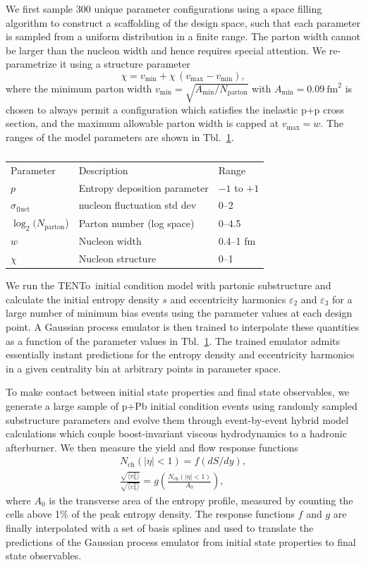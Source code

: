 \documentclass[3p,times,procedia]{elsarticle}
\newcommand{\trento}{T\raisebox{-0.3ex}{R}ENTo}
\newcommand{\e}{\varepsilon}
\newcommand{\paddedhline}{\noalign{\smallskip}\hline\noalign{\smallskip}}
\newcommand{\vn}{\sqrt{\langle v_n^2 \rangle}}
\newcommand{\en}{\sqrt{\langle \varepsilon_n^2 \rangle}}
\begin{document}
We first sample $300$ unique parameter configurations using a space filling algorithm to construct a scaffolding of the design space, such that each parameter is sampled from a uniform distribution in a finite range.
The parton width cannot be larger than the nucleon width and hence requires special attention.
We re-parametrize it using a structure parameter
\begin{equation}
  \chi = v_\mathrm{min} + \chi\, (v_\mathrm{max} - v_\mathrm{min}), 
\end{equation}
where the minimum parton width $v_\mathrm{min}=\sqrt{A_\mathrm{min}/N_\mathrm{parton}}$ with $A_\mathrm{min}=0.09 ~\mathrm{fm}^2$ is chosen to always permit a configuration which satisfies the inelastic p+p cross section, and the maximum allowable parton width is capped at $v_\mathrm{max} = w$.
The ranges of the model parameters are shown in Tbl.~\ref{ranges}.
\begin{table}[h]
  \centering
  \begin{tabular}{lll}
    Parameter & Description & Range \\
    \paddedhline
    $p$    & Entropy deposition parameter & $-1$ to $+1$ \\
    $\sigma_\mathrm{fluct}$ & nucleon fluctuation std dev & 0--2 \\
    $\log_2(N_\mathrm{parton}$) & Parton number (log space) & 0--4.5 \\
    $w$    & Nucleon width & 0.4--1 fm \\
    $\chi$ & Nucleon structure & 0--1
  \end{tabular}
  \caption{
    \label{ranges}
  }
\end{table}

We run the \trento\ initial condition model with partonic substructure and calculate the initial entropy density $s$ and eccentricity harmonics $\e_2$ and $\e_3$ for a large number of minimum bias events using the parameter values at each design point.
A Gaussian process emulator is then trained to interpolate these quantities as a function of the parameter values in Tbl.~\ref{ranges}.
The trained emulator admits essentially instant predictions for the entropy density  and eccentricity harmonics in a given centrality bin at arbitrary points in parameter space.

To make contact between initial state properties and final state observables, we generate a large sample of p+Pb initial condition events using randomly sampled substructure parameters and evolve them through event-by-event hybrid model calculations which couple boost-invariant viscous hydrodynamics to a hadronic afterburner.
We then measure the yield and flow response functions 
\begin{align}
  N_\mathrm{ch}(|\eta| < 1) = f(dS/dy), \\
  \frac{\vn}{\en} = g\left(\frac{N_\mathrm{ch}(|\eta| < 1)}{A_0}\right),
\end{align}
where $A_0$ is the transverse area of the entropy profile, measured by counting the cells above 1\% of the peak entropy density. 
The response functions $f$ and $g$ are finally interpolated with a set of basis splines and used to translate the predictions of the Gaussian process emulator from initial state properties to final state observables. 
\end{document}
